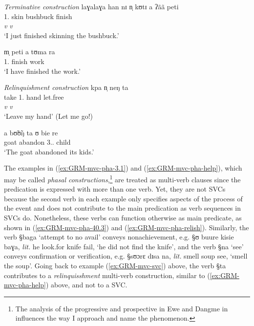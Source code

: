 \begin{exe}
\ex\label{ex:GRM-mvc-phase}
\begin{xlist}
\ex\label{ex:GRM-mvc-pha-3.1} {\it Terminative construction} 
\glll laɣalaɣa han nɪ n̩ kʊtɪ a ʔãã peti\\
{\advt} {\dem} {\postp} {1.\sg} {skin} {\art} bushbuck  finish\\
{} {} {} {}  {\it v} {} {} {\it v} \\
\glt `I  just finished skinning the bushbuck.'

\ex\label{ex:GRM-mvc-pha-40.3}
\gll  m̩ peti a tʊma ra \\
{1.\sg} finish {\art} work {\foc}\\
`I have finished the work.'


\ex\label{ex:GRM-mvc-pha-help}{\it Relinquishment construction}
\glll  kpa n̩ neŋ ta \\
take {1.\sg} hand let.free\\
{}  {\it v}  {} {\it v} \\
\glt `Leave my hand' (Let me go!)

\ex\label{ex:GRM-mvc-pha-relish} 
\gll a bʊ̃ʊ̃ŋ ta ʊ bie re \\
{\art} goat abandon {3.\sg.\poss} child {\foc}\\
`The goat abandoned its kids.'
\end{xlist}
\end{exe}

The examples  in (\ref{ex:GRM-mvc-pha-3.1}) and (\ref{ex:GRM-mvc-pha-help}),
which may be called  {\it phasal  constructions},\footnote{The analysis of the
progressive and prospective in Ewe and Dangme in \cite{Amek08} influences the
way I approach and name the phenomenon.}  are treated as multi-verb clauses
since the predication is expressed with more than one verb. Yet, they are not
SVCs because the second verb in each example only specifies aspects of the
process
of the event  and does not contribute to the main predication as verb sequences
in SVCs do. Nonetheless, these verbs can function otherwise as main predicate,
as shown in (\ref{ex:GRM-mvc-pha-40.3}) and (\ref{ex:GRM-mvc-pha-relish}).
Similarly, the verb {\S baga} `attempt to no avail'  conveys
nonachievement, e.g. {\S ʊ buure kisie baɣa}, {\it lit.} he look.for knife fail,
`he did not find the knife',  and the verb {\S na} `see' conveys confirmation or
verification, e.g. {\S sʊɔrɛ dɪsa na}, {\it lit.} smell soup see, `smell the
soup'. Going back to example (\ref{ex:GRM-mvc-svc}) above, the verb {\S ta}
contributes to a {\it relinquisshment} multi-verb construction, similar to
(\ref{ex:GRM-mvc-pha-help}) above, and not to a SVC. 
 
